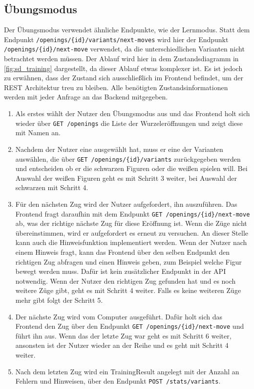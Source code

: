 \clearpage

\subsection{Übungsmodus}
Der Übungsmodus verwendet ähnliche Endpunkte, wie der Lernmodus. Statt dem Endpunkt \lstinline|/openings/{id}/variants/next-moves| wird hier der Endpunkt \lstinline|/openings/{id}/next-move| verwendet, da die unterschiedlichen Varianten nicht betrachtet werden müssen. Der Ablauf wird hier in dem Zustandsdiagramm in \autoref{fig:sd_training} dargestellt, da dieser Ablauf etwas komplexer ist. Es ist jedoch zu erwähnen, dass der Zustand sich ausschließlich im Frontend befindet, um der REST Architektur treu zu bleiben. Alle benötigten Zustandsinformationen werden mit jeder Anfrage an das Backend mitgegeben.

\begin{enumerate}
    \item Als erstes wählt der Nutzer den Übungsmodus aus und das Frontend holt sich wieder über \lstinline{GET /openings} die Liste der Wurzeleröffnungen und zeigt diese mit Namen an.
    \item Nachdem der Nutzer eine ausgewählt hat, muss er eine der Varianten auswählen, die über \lstinline|GET /openings/{id}/variants| zurückgegeben werden und entscheiden ob er die schwarzen Figuren oder die weißen spielen will. Bei Auswahl der weißen Figuren geht es mit Schritt 3 weiter, bei Auswahl der schwarzen mit Schritt 4.
    \item Für den nächsten Zug wird der Nutzer aufgefordert, ihn auszuführen. Das Frontend fragt daraufhin mit dem Endpunkt \lstinline|GET /openings/{id}/next-move| ab, was der richtige nächste Zug für diese Eröffnung ist. Wenn die Züge nicht übereinstimmen, wird er aufgefordert es erneut zu versuchen. An dieser Stelle kann auch die Hinweisfunktion implementiert werden. Wenn der Nutzer nach einem Hinweis fragt, kann das Frontend über den selben Endpunkt den richtigen Zug abfragen und einen Hinweis geben, zum Beispiel welche Figur bewegt werden muss. Dafür ist kein zusätzlicher Endpunkt in der API notwendig. Wenn der Nutzer den richtigen Zug gefunden hat und es noch weitere Züge gibt, geht es mit Schritt 4 weiter. Falls es keine weiteren Züge mehr gibt folgt der Schritt 5.
    \item Der nächste Zug wird vom Computer ausgeführt. Dafür holt sich das Frontend den Zug über den Endpunkt \lstinline|GET /openings/{id}/next-move| und führt ihn aus. Wenn das der letzte Zug war geht es mit Schritt 6 weiter, ansonsten ist der Nutzer wieder an der Reihe und es geht mit Schritt 4 weiter.
    \item Nach dem letzten Zug wird ein TrainingResult angelegt mit der Anzahl an Fehlern und Hinweisen, über den Endpunkt \lstinline|POST /stats/variants|.
\end{enumerate}

